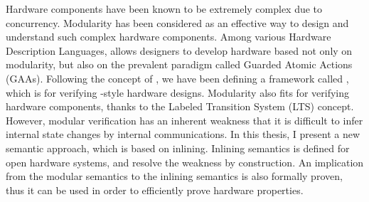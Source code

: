 % 
% 
%

Hardware components have been known to be extremely complex due to
concurrency. Modularity has been considered as an effective way to
design and understand such complex hardware components. Among various
Hardware Description Languages, \Bluespec{} allows designers to
develop hardware based not only on modularity, but also on the
prevalent paradigm called Guarded Atomic Actions (GAAs). Following the
concept of \Bluespec{}, we have been defining a framework
called \Kami{}, which is for verifying \Bluespec{}-style hardware
designs. Modularity also fits for verifying hardware components,
thanks to the Labeled Transition System (LTS) concept. However,
modular verification has an inherent weakness that it is difficult to
infer internal state changes by internal communications. In this
thesis, I present a new semantic approach, which is based on
inlining. Inlining semantics is defined for open hardware systems, and
resolve the weakness by construction. An implication from the modular
semantics to the inlining semantics is also formally proven, thus it
can be used in order to efficiently prove hardware properties.


